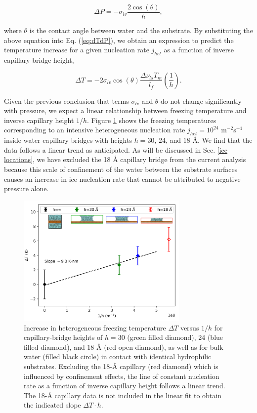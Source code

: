 \documentclass[journal abbreviation, manuscript]{copernicus}
\begin{document}
\begin{equation} \label{eq:dPh}
   \Delta P = -\sigma_{lv} \frac{2\cos(\theta)}{h},
\end{equation}

\noindent where $\theta$ is the contact angle between water and the substrate. By substituting the above equation into Eq. (\ref{eq:dTdP}), we obtain an expression to predict the temperature increase for a given nucleation rate $j_{het}$ as a function of inverse capillary bridge height,  

\begin{equation}\label{eq:dTh}
     \Delta T = -2 \sigma_{lv}\cos(\theta) \frac{\Delta \nu_{ls} T_m }{l_f} \left(\frac{1}{h}\right).
\end{equation}

\noindent Given the previous conclusion that terms $\sigma_{lv}$ and $\theta$ do not change significantly with pressure, we expect a linear relationship between freezing temperature and inverse capillary height $1/h$. Figure \ref{fig:capillary} shows the freezing temperatures corresponding to an intensive heterogeneous nucleation rate $j_{het} = 10^{24}$ m$^{-2}$s$^{-1}$ inside water capillary bridges with heights $h = 30$, $24$, and $18$ \AA{}. We find that the data follows a linear trend as anticipated. As will be discussed in Sec. \ref{ice locations}, we have excluded the 18 \AA{} capillary bridge from the current analysis because this scale of confinement of the water between the substrate surfaces causes an increase in ice nucleation rate that cannot be attributed to negative pressure alone.

\begin{figure}[t]
\includegraphics[width=8.3cm]{figures/TvH_inset.png}
\caption{Increase in heterogeneous freezing temperature $\Delta T$ versus $1/h$ for capillary-bridge heights of $h = 30$ (green filled diamond), 24 (blue filled diamond), and 18 \AA{} (red open diamond), as well as for bulk water (filled black circle) in contact with identical hydrophilic substrates. Excluding the 18-\AA{} capillary (red diamond) which is influenced by confinement effects, the line of constant nucleation rate as a function of inverse capillary height follows a linear trend. The 18-\AA{} capillary data is not included in the linear fit to obtain the indicated slope $\Delta T \cdot h$.}
    \label{fig:capillary}
\end{figure}
\end{document}
